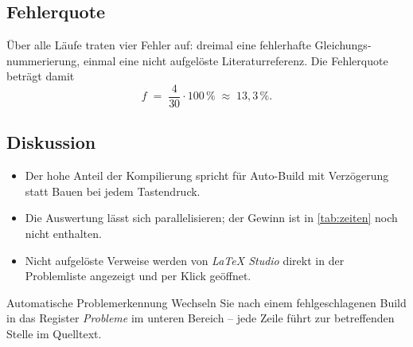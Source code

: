\subsection{Fehlerquote}

Über alle Läufe traten vier Fehler auf: dreimal eine fehlerhafte Gleichungs-
nummerierung, einmal eine nicht aufgelöste Literaturreferenz. Die Fehlerquote
beträgt damit
\[
  f \;=\; \frac{4}{30} \cdot 100\,\% \;\approx\; 13{,}3\,\%.
\]

\subsection{Diskussion}
\label{sec:diskussion}

\begin{itemize}[leftmargin=*]
  \item Der hohe Anteil der Kompilierung spricht für Auto-Build mit
    Verzögerung statt Bauen bei jedem Tastendruck.
  \item Die Auswertung lässt sich parallelisieren; der Gewinn ist in
    \cref{tab:zeiten} noch nicht enthalten.
  \item Nicht aufgelöste Verweise werden von \emph{LaTeX Studio} direkt in der
    Problemliste angezeigt und per Klick geöffnet.
\end{itemize}

\begin{hinweis}{Automatische Problemerkennung}
  Wechseln Sie nach einem fehlgeschlagenen Build in das Register
  \emph{Probleme} im unteren Bereich -- jede Zeile führt zur betreffenden
  Stelle im Quelltext.
\end{hinweis}
